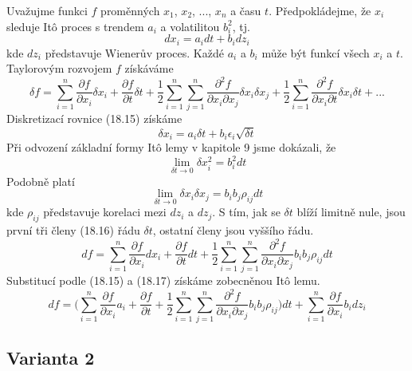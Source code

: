 \documentclass[a4paper]{book}
\begin{document}
Uvažujme funkci $f$ proměnných $x_1$, $x_2$, ..., $x_n$ a času $t$. Předpokládejme, že $x_i$ sleduje It\^o proces s trendem $a_i$ a volatilitou $b^2_i$, tj.
\begin{equation}
d x_i = a_i dt + b_i d z_i
\end{equation}
kde $d z_i$ představuje Wienerův proces. Každé $a_i$ a $b_i$ může být funkcí všech $x_i$ a $t$. Taylorovým rozvojem $f$ získáváme
\begin{equation}
\delta f = \sum^n_{i=1}\frac{\partial f}{\partial x_i} \delta x_i + \frac{\partial f}{\partial t} \delta t + \frac{1}{2} \sum^n_{i = 1} \sum^n_{j = 1} \frac{\partial^2 f}{\partial x_i \partial x_j} \delta x_i \delta x_j + \frac{1}{2} \sum^n_{i=1} \frac{\partial^2 f}{\partial x_i \partial t} \delta x_i \delta t + ...
\end{equation}
Diskretizací rovnice (18.15) získáme
\begin{equation*}
\delta x_i = a_i \delta t + b_i \epsilon_i \sqrt{\delta t}
\end{equation*}
Při odvození základní formy It\^o lemy v kapitole 9 jsme dokázali, že
\begin{equation*}
\lim \limits_{\delta t \to 0} \delta x^2_i = b^2_i dt 
\end{equation*}
Podobně platí
\begin{equation}
\lim \limits_{\delta t \to 0} \delta x_i \delta x_j = b_i b_j \rho_{ij} dt
\end{equation}
kde $\rho_{ij}$ představuje korelaci mezi $d z_i$ a $d z_j$. S tím, jak se $\delta t$ blíží limitně nule, jsou první tři členy (18.16) řádu $\delta t$, ostatní členy jsou vyššího řádu.
\begin{equation*}
d f = \sum^n_{i=1} \frac{\partial f}{\partial x_i} d x_i + \frac{\partial f}{\partial t} dt + \frac{1}{2} \sum^n_{i=1} \sum^n_{j=1}\frac{\partial^2 f}{\partial x_i \partial x_j}b_i b_j \rho_{ij}dt
\end{equation*}
Substitucí podle (18.15) a (18.17) získáme zobecněnou It\^o lemu.
\begin{equation*}
d f = \bigg( \sum^n_{i=1}\frac{\partial f}{\partial x_i} a_i + \frac{\partial f}{\partial t} + \frac{1}{2} \sum^n_{i=1} \sum^n_{j=1}\frac{\partial^2 f}{\partial x_i \partial x_j}b_i b_j \rho_{ij} \bigg) dt + \sum^n_{i=1}\frac{\partial f}{\partial x_i} b_i d z_i
\end{equation*}

\subsection{Varianta 2}
\end{document}
